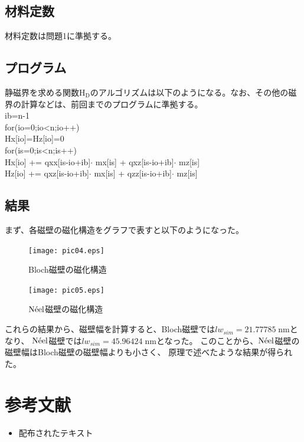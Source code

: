 \documentclass{jsarticle}
\begin{document}
\subsection{材料定数}
材料定数は問題1に準拠する。

\subsection{プログラム}
静磁界を求める関数$\mathrm{H_D}$のアルゴリズムは以下のようになる。なお、その他の磁界の計算などは、前回までのプログラムに準拠する。\\
ib=n-1	\\
for(io=0;\;io<n;\;io++)	\\
\quad Hx[io]=Hz[io]=0	\\
\quad for(is=0;\;is<n;\;is++)	\\
\quad\quad Hx[io] += qxx[is-io+ib]$\cdot$ mx[is] + qxz[is-io+ib]$\cdot$ mz[is]	\\
\quad\quad Hz[io] += qxz[is-io+ib]$\cdot$ mx[is] + qzz[is-io+ib]$\cdot$ mz[is]

\subsection{結果}
まず、各磁壁の磁化構造をグラフで表すと以下のようになった。
\begin{figure}[H]
	\centering
	\texttt{[image: pic04.eps]}
	\caption{Bloch磁壁の磁化構造}
	\label{fig04}
\end{figure}
\begin{figure}[H]
	\centering
	\texttt{[image: pic05.eps]}
	\caption{$\mathrm{N\Acute{e}el}$磁壁の磁化構造}
	\label{fig05}
\end{figure}

これらの結果から、磁壁幅を計算すると、Bloch磁壁では$lw_{sim} = 21.77785\;\mathrm{nm}$となり、
$\mathrm{N\Acute{e}el}$磁壁では$lw_{sim} = 45.96424\;\mathrm{nm}$となった。
このことから、$\mathrm{N\Acute{e}el}$磁壁の磁壁幅はBloch磁壁の磁壁幅よりも小さく、
原理で述べたような結果が得られた。


\section{参考文献}

\begin{itemize}
  \item 配布されたテキスト
\end{itemize}
\end{document}

